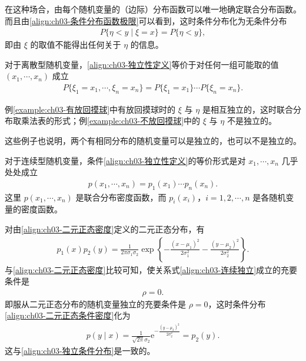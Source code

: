 \documentclass[../../main.tex]{subfiles}
\begin{document}
在这种场合，由每个随机变量的（边际）分布函数可以唯一地确定联合分布函数。而且由\eqref{align:ch03-条件分布函数极限}可以看到，这时条件分布化为无条件分布
\begin{align}
P\{\eta<y\mid\xi=x\}=P\{\eta<y\},\label{align:ch03-独立条件分布}
\end{align}
即由 $\xi$ 的取值不能得出任何关于 $\eta$ 的信息。

对于离散型随机变量，\eqref{align:ch03-独立性定义}等价于对任何一组可能取的值 $(x_1,\cdots,x_n)$ 成立
\begin{align}
P\{\xi_1=x_1,\cdots,\xi_n=x_n\}=P\{\xi_1=x_1\}\cdots P\{\xi_n=x_n\}.\label{align:ch03-离散独立}
\end{align}

例\ref{example:ch03-有放回摸球}中有放回摸球时的 $\xi$ 与 $\eta$ 是相互独立的，这时联合分布取乘法表的形式；例\ref{example:ch03-不放回摸球}中的 $\xi$ 与 $\eta$ 不是独立的。

这些例子也说明，两个有相同分布的随机变量可以是独立的，也可以不是独立的。

对于连续型随机变量，条件\eqref{align:ch03-独立性定义}的等价形式是对 $x_1,\cdots,x_n$ 几乎处处成立
\begin{align}
p(x_1,\cdots,x_n)=p_1(x_1)\cdots p_n(x_n).\label{align:ch03-连续独立}
\end{align}
这里 $p(x_1,\cdots,x_n)$ 是联合分布密度函数，而 $p_i(x_i)$，$i=1,2,\cdots,n$ 是各随机变量的密度函数。

\begin{example}[二元正态的独立性]\label{example:ch03-二元正态独立}
对由\eqref{align:ch03-二元正态密度}定义的二元正态分布，有
\begin{align*}p_1(x)p_2(y)=\frac{1}{2\pi\sigma_1\sigma_2}\exp\left\{-\frac{(x-\mu_1)^{2}}{2\sigma_1^{2}}-\frac{(y-\mu_2)^{2}}{2\sigma_2^{2}}\right\}.\end{align*}
与\eqref{align:ch03-二元正态密度}比较可知，使关系式\eqref{align:ch03-连续独立}成立的充要条件是
\begin{align*}\rho=0.\end{align*}
即服从二元正态分布的随机变量独立的充要条件是 $\rho=0$，这时条件分布\eqref{align:ch03-二元正态条件密度}化为
\begin{align*}p(y\mid x)=\frac{1}{\sqrt{2\pi}\sigma_2}\mathrm{e}^{-\frac{(y-\mu_2)^{2}}{2\sigma_2^{2}}}=p_2(y).\end{align*}
这与\eqref{align:ch03-独立条件分布}是一致的。
\end{example}
\end{document}
